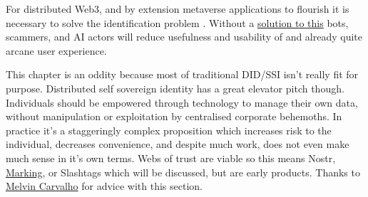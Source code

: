 For distributed Web3, and by extension metaverse applications to flourish it is necessary to solve the identification problem \cite{king1966fisher}. Without a \href{https://joshgans.medium.com/web3-isnt-going-to-work-without-identification-6aa776d674}{solution to this} bots, scammers, and AI actors will reduce usefulness and usability of and already quite arcane user experience.\par  
This chapter is an oddity because most of traditional DID/SSI isn't really fit for purpose. Distributed self sovereign identity has a great elevator pitch though. Individuals should be empowered through technology to manage their own data, without manipulation or exploitation by centralised corporate behemoths. In practice it's a staggeringly complex proposition which increases risk to the individual, decreases convenience, and despite much work, does not even make much sense in it's own terms. Webs of trust are viable so this means Nostr, \href{https://github.com/project-bitmark/marking/wiki#marking}{Marking}, or Slashtags which will be discussed, but are early products. %
Thanks to \href{https://github.com/melvincarvalho}{Melvin Carvalho} for advice with this section.
